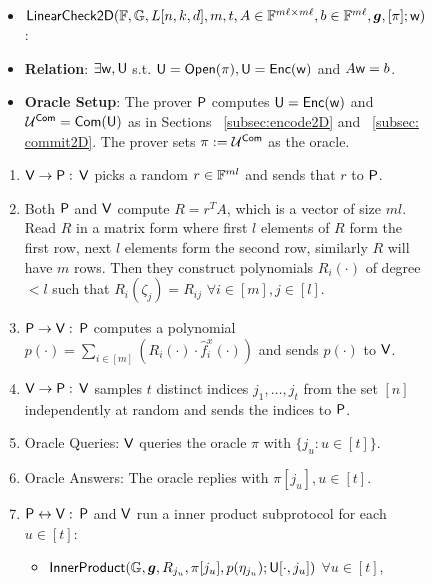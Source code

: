 \begin{figure}[h!]
\centering
\begin{framed}
	\begin{itemize}
		\item {$\mathsf{LinearCheck2D} (\mathbb{F}, \mathbb{G}, L[n,k,d], m, t, A \in \mathbb{F}^{m\ell \times m\ell}, b\in \mathbb{F}^{m\ell}, \bm{g}, [\pi]; \mathsf{w})$}:
		\item {\bf Relation}: $\exists \mathsf{w}, \mathsf{U}$ s.t. $\mathsf{U} = \mathsf{Open}(\pi), \mathsf{U} = \mathsf{Enc}(\mathsf{w})$ and $A\mathsf{w} = b$. 
		\item {\bf Oracle Setup}: The prover $\mathsf{P}$ computes $\mathsf{U} = \mathsf{Enc}(\mathsf{w})$ and $\mathcal{U}^{\mathsf{Com}} = \mathsf{Com}(\mathsf{U})$ as in Sections ~\ref{subsec:encode2D} and ~\ref{subsec: commit2D}. The prover sets $\pi := \mathcal{U}^{\mathsf{Com}}$ as the oracle.
	\end{itemize}
\begin{enumerate}[{\rm 1.}]
	\item $\mathsf{V} \rightarrow \mathsf{P}: $ $\mathsf{V}$ picks a random $r\in \mathbb{F}^{ml}$ and sends that $r$ to $\mathsf{P}$.
	
	\item Both $\mathsf{P}$ and $\mathsf{V}$ compute $R=r^TA$, which is a vector of size $ml$. Read $R$ in a matrix form where first $l$ elements of $R$ form the first row, next $l$ elements form the second row, similarly $R$ will have $m$ rows. Then they construct polynomials $R_i(\cdot)$ of degree $<l$ such that $R_i(\zeta_j)=R_{ij}$ $\forall i\in [m], j\in [l]$. 
	
	\item $\mathsf{P} \rightarrow \mathsf{V}: $  $\mathsf{P}$ computes a polynomial $p(\cdot)=\sum_{i\in[m]} ( R_i(\cdot)\cdot \hat{f}^x_i(\cdot))$ and sends $p(\cdot)$ to $\mathsf{V}$.
	
	\item $\mathsf{V} \rightarrow \mathsf{P}: $ $\mathsf{V}$ samples $t$ distinct  indices $j_1,\ldots,j_t$ from the set $[n]$ independently at random and sends the indices to $\mathsf{P}$.
	
	\item Oracle Queries: $\mathsf{V}$ queries the oracle $\pi$ with $\{j_u : u\in [t]\}$.
	
	\item Oracle Answers: The oracle replies with $\pi[j_u], u\in [t]$.
	
	\item $\mathsf{P} \leftrightarrow \mathsf{V}: $ $\mathsf{P}$ and $\mathsf{V}$ run a inner product subprotocol for each $u\in[t]$:
	\begin{itemize}
		\item $\mathsf{InnerProduct}(\mathbb{G},\bm{g}, R_{j_u}, \pi[j_u], p(\eta_{j_u}); \mathsf{U}[\cdot,j_u])$ $\forall u\in [t]$,
		

\end{itemize}
\end{enumerate}
\end{framed}
\end{figure}
